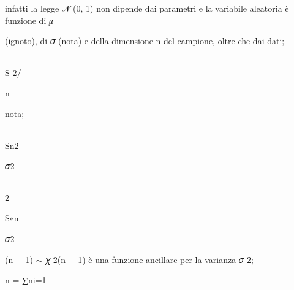 \documentclass[a4paper,portrait,12pt]{article}
\begin{document}
\begin{flushleft}
infatti la legge 𝒩 (0, 1) non dipende dai parametri e la variabile aleatoria \`{e} funzione di 𝜇
\end{flushleft}


\begin{flushleft}
(ignoto), di 𝜎 (nota) e della dimensione n del campione, oltre che dai dati;
\end{flushleft}


$-$





\begin{flushleft}
S 2/
\end{flushleft}


\begin{flushleft}
n
\end{flushleft}





\begin{flushleft}
nota;
\end{flushleft}


$-$





\begin{flushleft}
Sn2
\end{flushleft}


\begin{flushleft}
𝜎2
\end{flushleft}





$-$





2


\begin{flushleft}
S∗n
\end{flushleft}


\begin{flushleft}
𝜎2
\end{flushleft}





\begin{flushleft}
(n $-$ 1) $\sim$ 𝜒 2(n $-$ 1) \`{e} una funzione ancillare per la varianza 𝜎 2;
\end{flushleft}


\begin{flushleft}
n = ∑ni=1
\end{flushleft}
\end{document}
